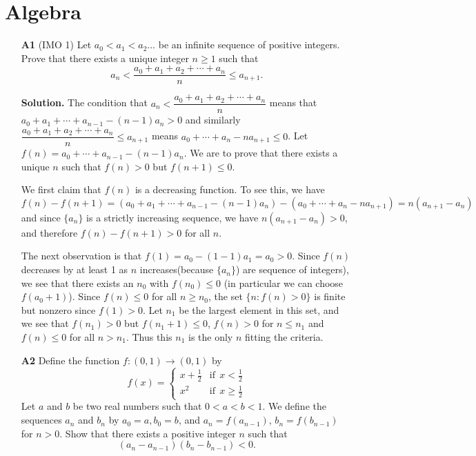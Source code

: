 \documentclass[11pt,a4paper]{article}
\begin{document}
\newcommand{\la}{\leftarrow}
\newcommand{\lra}{\leftrightarrow}
\newcommand{\bbN}{\mathbb{N}}
\newcommand{\bbZ}{\mathbb{Z}}
\newcommand{\dsum}{\displaystyle\sum}
\newcommand{\dprod}{\displaystyle\prod}

\section*{Algebra}
\begin{enumerate}
	\item [\textbf{A1}] (IMO 1) Let $a_0 < a_1 < a_2 \ldots$ be an infinite sequence of positive integers. Prove that there exists a unique integer $n\geq 1$ such that
	\[a_n < \frac{a_0+a_1+a_2+\cdots+a_n}{n} \leq a_{n+1}.\]
	
	\textbf{Solution.} The condition that $a_n<\dfrac{a_0+a_1+a_2+\cdots+a_n}{n}$ means that $a_0+a_1+\cdots + a_{n-1}-(n-1)a_n>0$ and similarly $\dfrac{a_0+a_1+a_2+\cdots+a_n}{n} \leq a_{n+1}$ means $a_0+\cdots + a_n-na_{n+1}\le 0$. 
	Let $f(n)=a_0+\cdots + a_{n-1}-(n-1)a_n$. We are to prove that there exists a unique $n$ such that $f(n)>0$ but $f(n+1)\le 0$. 
	
	We first claim that $f(n)$ is a decreasing function. To see this, we have 
	\[f(n)-f(n+1) = (a_0+a_1+\cdots + a_{n-1}-(n-1)a_n) - (a_0+\cdots + a_n-na_{n+1})
	=n(a_{n+1}-a_n)
	\]
	and since $\{a_n\}$ is a strictly increasing sequence, we have $n(a_{n+1}-a_n)>0$, and therefore $f(n)-f(n+1)>0$ for all $n$. 
	
	The next observation is that $f(1)=a_0-(1-1)a_1=a_0>0$. Since $f(n)$ decreases by at least 1 as $n$ increases(because $\{a_n\}$) are sequence of integers), we see that there exists an $n_0$ with $f(n_0)\le 0$ (in particular we can choose $f(a_0+1)$). 
	Since $f(n)\le 0$ for all $n\ge n_0$, the set $\{n: f(n)>0\}$ is finite but nonzero since $f(1)>0$. Let $n_1$ be the largest element in this set, and we see that $f(n_1)>0$ but $f(n_1+1)\le 0$, $f(n)>0$ for $n\le n_1$ and $f(n)\le 0$ for all $n>n_1$. Thus this $n_1$ is the only $n$ fitting the criteria. 
	
	\item[\textbf{A2}] Define the function $f:(0,1)\to (0,1)$ by \[\displaystyle f(x) = \left\{ \begin{array}{lr} x+\frac 12 & \text{if}\ \  x < \frac 12\\ x^2 & \text{if}\ \  x \ge \frac 12 \end{array} \right.\] Let $a$ and $b$ be two real numbers such that $0 < a < b < 1$. We define the sequences $a_n$ and $b_n$ by $a_0 = a, b_0 = b$, and $a_n = f( a_{n -1})$, $b_n = f (b_{n -1} )$ for $n > 0$. Show that there exists a positive integer $n$ such that \[(a_n - a_{n-1})(b_n-b_{n-1})<0.\]
	

\end{enumerate}
\end{document}
